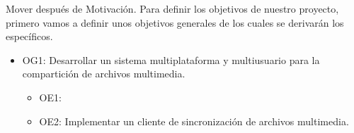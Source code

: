 Mover después de Motivación.
Para definir los objetivos de nuestro proyecto, primero vamos a definir unos objetivos generales de los cuales se derivarán los específicos.
\begin{itemize}
    \item OG1: Desarrollar un sistema multiplataforma y multiusuario para la compartición de archivos multimedia.
        \begin{itemize}
            \item OE1: 
            \item OE2: Implementar un cliente de sincronización de archivos multimedia.
        \end{itemize}
\end{itemize}

